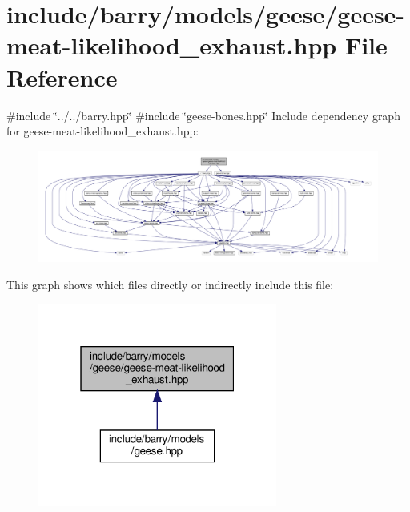 \hypertarget{geese-meat-likelihood__exhaust_8hpp}{}\section{include/barry/models/geese/geese-\/meat-\/likelihood\+\_\+exhaust.hpp File Reference}
\label{geese-meat-likelihood__exhaust_8hpp}
{\ttfamily \#include \char`\"{}../../barry.\+hpp\char`\"{}}\newline
{\ttfamily \#include \char`\"{}geese-\/bones.\+hpp\char`\"{}}\newline
Include dependency graph for geese-\/meat-\/likelihood\+\_\+exhaust.hpp\+:
\nopagebreak
\begin{figure}[H]
\begin{center}
\leavevmode
\includegraphics[width=350pt]{geese-meat-likelihood__exhaust_8hpp__incl}
\end{center}
\end{figure}
This graph shows which files directly or indirectly include this file\+:
\nopagebreak
\begin{figure}[H]
\begin{center}
\leavevmode
\includegraphics[width=223pt]{geese-meat-likelihood__exhaust_8hpp__dep__incl}
\end{center}
\end{figure}
